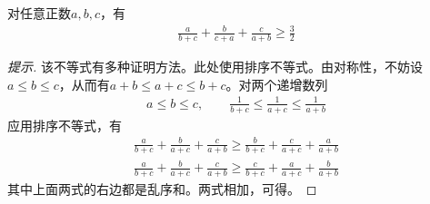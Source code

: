 \begin{example}对任意正数$a,b,c$，有
  \begin{align*}
    \frac{a}{b+c}+\frac{b}{c+a}+\frac{c}{a+b}\ge \frac32
  \end{align*}
\end{example}
\begin{proof}[提示]
  该不等式有多种证明方法。此处使用排序不等式。由对称性，不妨设$a\le b\le c$，从而有$a+b\le a+c\le b+c$。对两个递增数列
  \begin{align*}
    a \le b \le c, \quad \quad \frac1{b+c}\le \frac1{a+c}\le \frac1{a+b}
  \end{align*}
  应用排序不等式，有
  \begin{align*}
    \frac{a}{b+c}+\frac{b}{a+c}+\frac{c}{a+b}\ge \frac{b}{b+c}+\frac{c}{a+c}+\frac{a}{a+b}\\
    \frac{a}{b+c}+\frac{b}{a+c}+\frac{c}{a+b}\ge \frac{c}{b+c}+\frac{a}{a+c}+\frac{b}{a+b}
  \end{align*}
  其中上面两式的右边都是乱序和。两式相加，可得。
\end{proof}

    

